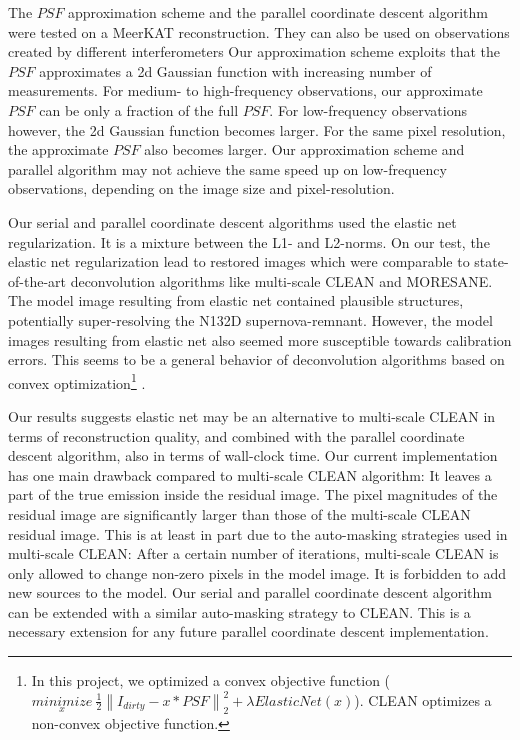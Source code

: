 The $PSF$ approximation scheme and the parallel coordinate descent algorithm were tested on a MeerKAT reconstruction. They can also be used on observations created by different interferometers Our approximation scheme exploits that the $PSF$ approximates a 2d Gaussian function with increasing number of measurements. For medium- to high-frequency observations, our approximate $PSF$ can be only a fraction of the full $PSF$. For low-frequency observations however, the 2d Gaussian function becomes larger. For the same pixel resolution, the approximate $PSF$ also becomes larger. Our approximation scheme and parallel algorithm may not achieve the same speed up on low-frequency observations, depending on the image size and pixel-resolution. 


Our serial and parallel coordinate descent algorithms used the elastic net regularization. It is a mixture between the L1- and L2-norms. On our test, the elastic net regularization lead to restored images which were comparable to state-of-the-art deconvolution algorithms like multi-scale CLEAN and MORESANE. The model image resulting from elastic net contained plausible structures, potentially super-resolving the N132D supernova-remnant. However, the model images resulting from elastic net also seemed more susceptible towards calibration errors. This seems to be a general behavior of deconvolution algorithms based on convex optimization\footnote{In this project, we optimized a convex objective function ($\underset{x}{minimize} \: \frac{1}{2} \left \| I_{dirty} - x * PSF \right \|_2^2 + \lambda ElasticNet(x)$). CLEAN optimizes a non-convex objective function.} \cite{offringa2017optimized}.

Our results suggests elastic net may be an alternative to multi-scale CLEAN in terms of reconstruction quality, and combined with the parallel coordinate descent algorithm, also in terms of wall-clock time. Our current implementation has one main drawback compared to multi-scale CLEAN algorithm: It leaves  a part of the true emission inside the residual image. The pixel magnitudes of the residual image are significantly larger than those of the multi-scale CLEAN residual image. This is at least in part due to the auto-masking strategies used in multi-scale CLEAN: After a certain number of iterations, multi-scale CLEAN is only allowed to change non-zero pixels in the model image. It is forbidden to add new sources to the model. Our serial and parallel coordinate descent algorithm can be extended with a similar auto-masking strategy to CLEAN. This is a necessary extension for any future parallel coordinate descent implementation.

